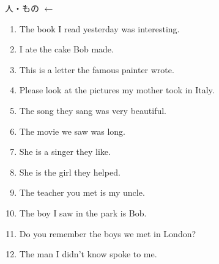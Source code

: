 \documentclass[aspectratio=169,xcolor={dvipsnames,table}]{beamer}
\begin{document}
\begin{frame}[plain,label=ichiran]{人・もの $\leftarrow$ }
 \begin{enumerate}
  \item The book  I read yesterday was interesting.
  \item I ate the cake  Bob made.
  \item This is a letter  the famous painter wrote.
  \item Please look at the pictures  my mother took in Italy.
  \item The song  they sang was very beautiful.
  \item The movie  we saw was long.
  \item She is a singer  they like.
  \item She is the girl  they helped.
  \item The teacher  you met is my uncle.
  \item The boy  I saw in the park is Bob.
  \item Do you remember the boys  we met in London?
  \item The man  I didn't know spoke to me.
 \end{enumerate}
\end{frame}
\end{document}
